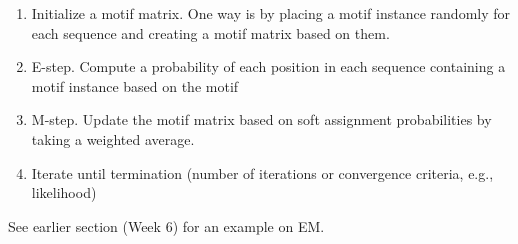 \documentclass[10pt]{article}
\begin{document}
\begin{enumerate}
    \item Initialize a motif matrix.  One way is by placing a motif instance randomly for each sequence and creating a motif matrix based on them.
    \item E-step.  Compute a probability of each position in each sequence containing a motif instance based on the motif
    \item M-step.  Update the motif matrix based on soft assignment probabilities by taking a weighted average.
    \item Iterate until termination (number of iterations or convergence criteria, e.g., likelihood)
\end{enumerate}
See earlier section (Week 6) for an example on EM.
\end{document}

